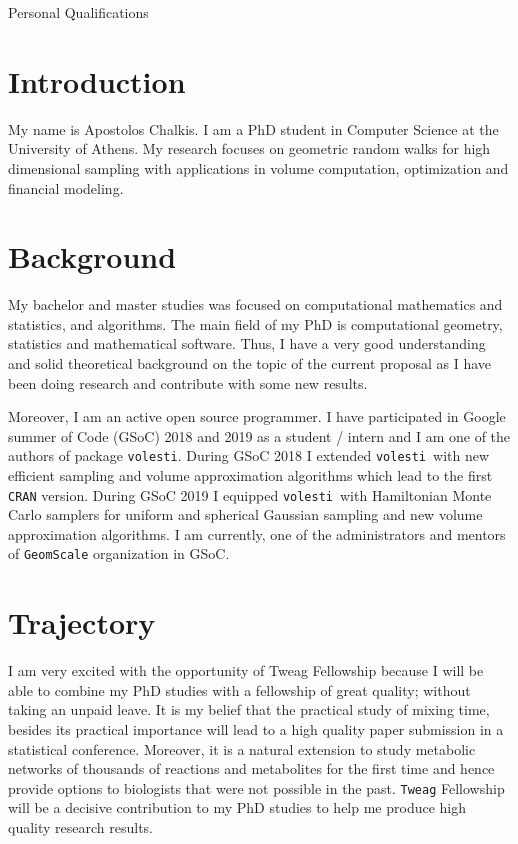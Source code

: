 \documentclass[a4paper, 12pt]{article}
\def\volesti{{\tt volesti}}
\begin{document}
\begin{center}
    \LARGE{Personal Qualifications}
\end{center}

\section{Introduction}

My name is Apostolos Chalkis. I am a PhD student in Computer Science at the University of Athens. My research focuses on geometric random walks for high dimensional sampling with applications in volume computation, optimization and financial modeling.

\section{Background}

My bachelor and master studies was focused on computational mathematics and statistics, and algorithms. The main field of my PhD is computational geometry, statistics
and mathematical software.
Thus, I have a very good understanding and solid theoretical background on the topic of
the current proposal as I have been doing research and contribute with some new results.

Moreover, I am an active open source programmer. 
I have participated in Google summer of Code (GSoC) 2018 and 2019 as a student / intern and I am one of the authors of package \volesti. 
During GSoC 2018 I extended \volesti\ with new efficient sampling and volume approximation algorithms which lead to the first {\tt CRAN} version. 
During GSoC 2019 I equipped \volesti\ with Hamiltonian Monte Carlo samplers for uniform and spherical Gaussian sampling and new volume approximation algorithms. I am currently, one of the administrators and mentors of {\tt GeomScale} organization in GSoC. %

\section{Trajectory}
I am very excited with the opportunity of Tweag Fellowship because I will be able to combine my PhD studies with a fellowship of great quality;
without taking an unpaid leave. It is my belief that the practical study of mixing time, besides its practical importance will lead to a high quality paper submission in a statistical conference. Moreover, it is a natural extension to study metabolic networks of thousands of reactions and metabolites for the first time and hence provide options to biologists that were not possible in the past. {\tt Tweag} Fellowship will be a decisive contribution to my PhD studies to help me produce high quality research results.%
\end{document}
